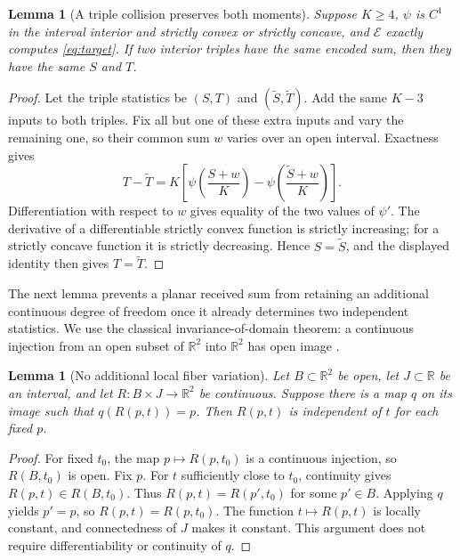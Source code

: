 \documentclass[11pt,letterpaper]{article}
\newtheorem{lemma}[theorem]{Lemma}
\theoremstyle{remark}
\newcommand{\enc}{\mathscr E}
\newcommand{\R}{\mathbb R}
\begin{document}
\begin{lemma}[A triple collision preserves both moments]
\label{lem:collision}
Suppose $K\ge4$, $\psi$ is $C^1$ in the interval interior and strictly convex or strictly concave, and $\enc$ exactly computes \eqref{eq:target}. If two interior triples have the same encoded sum, then they have the same $S$ and $T$.
\end{lemma}
\begin{proof}
Let the triple statistics be $(S,T)$ and $(\widetilde S,\widetilde T)$. Add the same $K-3$ inputs to both triples. Fix all but one of these extra inputs and vary the remaining one, so their common sum $w$ varies over an open interval. Exactness gives
$$
 T-\widetilde T
 =K\left[\psi\!\left(\frac{S+w}{K}\right)
 -\psi\!\left(\frac{\widetilde S+w}{K}\right)\right].
$$
Differentiation with respect to $w$ gives equality of the two values of $\psi'$. The derivative of a differentiable strictly convex function is strictly increasing; for a strictly concave function it is strictly decreasing. Hence $S=\widetilde S$, and the displayed identity then gives $T=\widetilde T$.
\end{proof}

The next lemma prevents a planar received sum from retaining an additional continuous degree of freedom once it already determines two independent statistics. We use the classical invariance-of-domain theorem: a continuous injection from an open subset of $\R^2$ into $\R^2$ has open image \cite[Theorem 2B.3]{hatcher}.

\begin{lemma}[No additional local fiber variation]
\label{lem:topology}
Let $B\subset\R^2$ be open, let $J\subset\R$ be an interval, and let $R:B\times J\to\R^2$ be continuous. Suppose there is a map $q$ on its image such that $q(R(p,t))=p$. Then $R(p,t)$ is independent of $t$ for each fixed $p$.
\end{lemma}
\begin{proof}
For fixed $t_0$, the map $p\mapsto R(p,t_0)$ is a continuous injection, so $R(B,t_0)$ is open. Fix $p$. For $t$ sufficiently close to $t_0$, continuity gives $R(p,t)\in R(B,t_0)$. Thus $R(p,t)=R(p',t_0)$ for some $p'\in B$. Applying $q$ yields $p'=p$, so $R(p,t)=R(p,t_0)$. The function $t\mapsto R(p,t)$ is locally constant, and connectedness of $J$ makes it constant. This argument does not require differentiability or continuity of $q$.
\end{proof}
\end{document}
